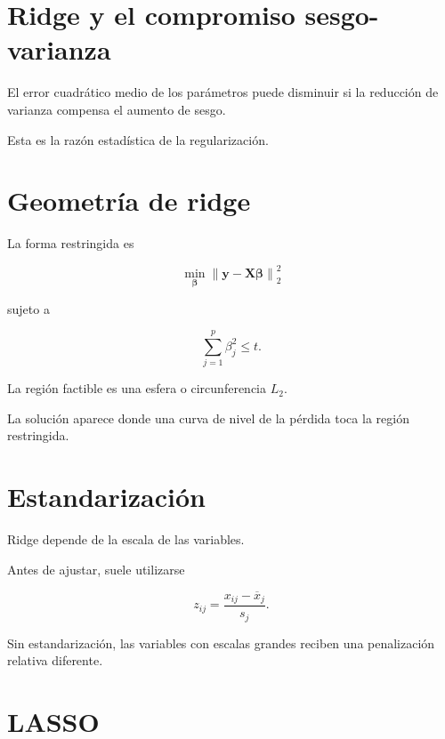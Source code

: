 \documentclass[
  spanish,
  10.5pt,
  letterpaper,
  DIV=11,
  numbers=noendperiod,
  oneside,
  open=any]{scrreprt}
\theoremstyle{definition}
\theoremstyle{definition}
\theoremstyle{plain}
\theoremstyle{remark}
\begin{document}
\section*{Ridge y el compromiso
sesgo-varianza}\label{ridge-y-el-compromiso-sesgo-varianza}


El error cuadrático medio de los parámetros puede disminuir si la
reducción de varianza compensa el aumento de sesgo.

Esta es la razón estadística de la regularización.

\section*{Geometría de ridge}\label{geometruxeda-de-ridge}


La forma restringida es

\[
\min_{\boldsymbol{\beta}}
\left\|
\mathbf{y}
-
\mathbf{X}\boldsymbol{\beta}
\right\|_2^2
\]

sujeto a

\[
\sum_{j=1}^{p}
\beta_j^2
\leq
t.
\]

La región factible es una esfera o circunferencia \(L_2\).

La solución aparece donde una curva de nivel de la pérdida toca la
región restringida.

\section*{Estandarización}\label{estandarizaciuxf3n}


Ridge depende de la escala de las variables.

Antes de ajustar, suele utilizarse

\[
z_{ij}
=
\frac{
x_{ij}-\overline{x}_j
}{
s_j
}.
\]

Sin estandarización, las variables con escalas grandes reciben una
penalización relativa diferente.

\section*{LASSO}\label{lasso}
\end{document}
